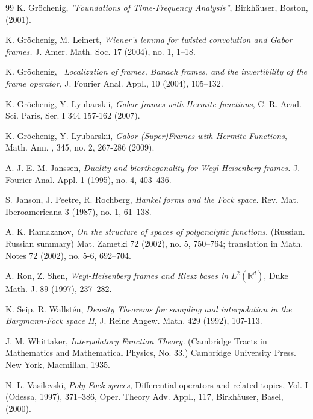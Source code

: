 \documentclass[12pt]{amsart}
\theoremstyle{plain}
\numberwithin{equation}{section}
\begin{document}
\begin{thebibliography}{99}
 K. Gr\"{o}chenig, \emph{\textquotedblright Foundations of
Time-Frequency Analysis\textquotedblright }, Birkh\"{a}user, Boston, (2001).

 K. Gr\"{o}chenig, M. Leinert, \emph{Wiener's lemma for twisted
convolution and Gabor frames.} J. Amer. Math. Soc. 17 (2004), no. 1, 1--18.

 K. Gr\"{o}chenig, \emph{\ Localization of frames,
Banach frames, and the invertibility of the frame operator}, J. Fourier
Anal. Appl., 10 (2004), 105--132.

 K. Gr\"{o}chenig, Y. Lyubarskii, \emph{Gabor frames
with Hermite functions}, C. R. Acad. Sci. Paris, Ser. I 344 157-162 (2007).

 K. Gr\"{o}chenig, Y. Lyubarskii, \emph{Gabor
(Super)Frames with Hermite Functions}, Math. Ann. , 345, no. 2, 267-286
(2009).

 A. J. E. M. Janssen, \emph{Duality and
biorthogonality for Weyl-Heisenberg frames.} J. Fourier Anal. Appl. 1
(1995), no. 4, 403--436.

 S. Janson, J. Peetre, R. Rochberg, \emph{Hankel forms and the
Fock space.} Rev. Mat. Iberoamericana 3 (1987), no. 1, 61--138.

 A. K. Ramazanov, \emph{On the structure of spaces of
polyanalytic functions.} (Russian. Russian summary) Mat. Zametki 72 (2002),
no. 5, 750--764; translation in Math. Notes 72 (2002), no. 5-6, 692--704.

 A. Ron, Z. Shen, \emph{Weyl-Heisenberg frames and Riesz
bases in }$L^{2}(%
\mathbb{R}
^{d})$, Duke Math. J. 89 (1997), 237--282.

 K. Seip, R. Wallst\'{e}n, \emph{Density Theorems for sampling
and interpolation in the Bargmann-Fock space II}, J. Reine Angew. Math. 429
(1992), 107-113.

 J. M. Whittaker, \emph{Interpolatory Function Theory.}
(Cambridge Tracts in Mathematics and Mathematical Physics, No. 33.)
Cambridge University Press. New York, Macmillan, 1935.

 N. L. Vasilevski, \emph{Poly-Fock spaces,} Differential
operators and related topics, Vol. I (Odessa, 1997), 371--386, Oper. Theory
Adv. Appl., 117, Birkh\"{a}user, Basel, (2000).
\end{thebibliography}
\end{document}
